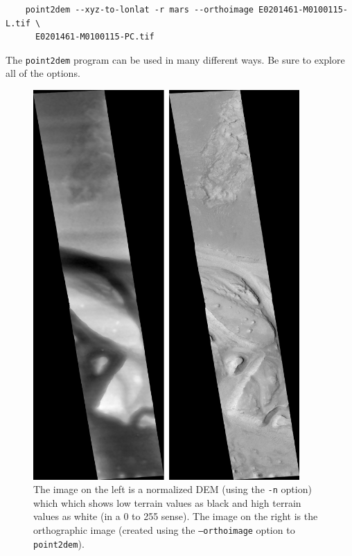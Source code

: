 \begin{verbatim}
    point2dem --xyz-to-lonlat -r mars --orthoimage E0201461-M0100115-L.tif \
      E0201461-M0100115-PC.tif
\end{verbatim}

\noindent
The \texttt{point2dem} program can be used in many different ways.
Be sure to explore all of the options.

\begin{figure}
\begin{minipage}{4in}
\includegraphics[width=4in]{images/p19-norm_ortho.png}
\end{minipage}
\hfill
\begin{minipage}{2.7in}
\caption[P19 Normalized DEM and Orthophoto]{
    \label{p19-norm_ortho}
	The image on the left is a normalized DEM (using the
	\texttt{-n} option) which which shows low terrain values
	as black and high terrain values as white (in a 0 to 255
	sense).  The image on the right is the orthographic image
	(created using the \texttt{--orthoimage} option to
	\texttt{point2dem}).
    }
\end{minipage} \end{figure}


